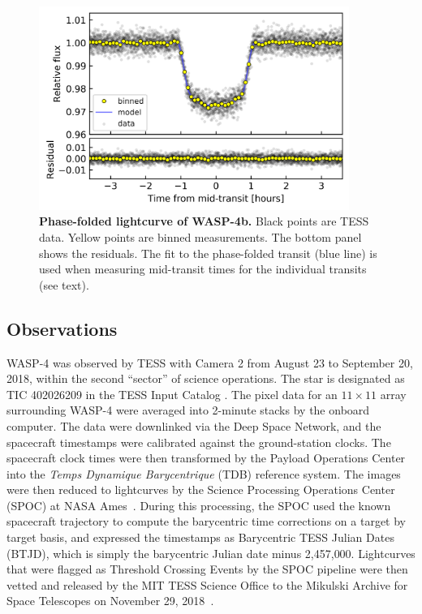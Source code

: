 \documentclass[12pt,twocolumn,tighten]{aastex62}
\begin{document}
\begin{figure}[t]
    \begin{center}
        \includegraphics[width=0.9\textwidth]{f2.png}
    \end{center}
    \vspace{-0.7cm}
    \caption{
        {\bf Phase-folded lightcurve of WASP-4b.} Black points are
        TESS data. Yellow points are binned measurements.  The bottom
        panel shows the residuals.  The fit to the phase-folded
        transit (blue line) is used when measuring mid-transit times
        for the individual transits (see text).
        \label{fig:phasefold}
    }
\end{figure}

\subsection{Observations}

WASP-4 was observed by TESS with Camera 2 from August 23 to September
20, 2018, within the second ``sector'' of science operations.  The
star is designated as TIC 402026209 in the TESS Input Catalog
\citep{stassun_TIC_2018}.  The pixel data for an $11\times11$ array
surrounding WASP-4 were averaged into 2-minute stacks by the onboard
computer.  The data were downlinked via the Deep Space Network, and
the spacecraft timestamps were calibrated against the ground-station
clocks.  The spacecraft clock times were then transformed by the
Payload Operations Center into the {\it Temps Dynamique Barycentrique}
(TDB) reference system.  The images were then reduced to lightcurves
by the Science Processing Operations Center (SPOC) at NASA
Ames~\citep{jenkins_tess_2016}.  During this processing, the SPOC used
the known spacecraft trajectory to compute the barycentric time
corrections on a target by target basis, and expressed the timestamps
as Barycentric TESS Julian Dates (BTJD), which is simply the
barycentric Julian date minus 2{,}457{,}000.  Lightcurves that were
flagged as Threshold Crossing Events by the SPOC pipeline were then
vetted and released by the MIT TESS Science Office to the Mikulski
Archive for Space Telescopes on November 29,
2018~\citep{ricker_tess_alerts_2018}.
\end{document}
